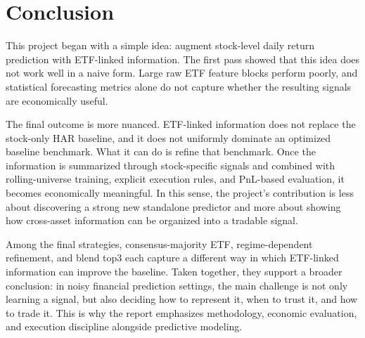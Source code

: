 \section{Conclusion}

This project began with a simple idea: augment stock-level daily return prediction with ETF-linked information. The first pass showed that this idea does not work well in a naive form. Large raw ETF feature blocks perform poorly, and statistical forecasting metrics alone do not capture whether the resulting signals are economically useful.

The final outcome is more nuanced. ETF-linked information does not replace the stock-only HAR baseline, and it does not uniformly dominate an optimized baseline benchmark. What it can do is refine that benchmark. Once the information is summarized through stock-specific signals and combined with rolling-universe training, explicit execution rules, and PnL-based evaluation, it becomes economically meaningful. In this sense, the project's contribution is less about discovering a strong new standalone predictor and more about showing how cross-asset information can be organized into a tradable signal.

Among the final strategies, consensus-majority ETF, regime-dependent refinement, and blend top3 each capture a different way in which ETF-linked information can improve the baseline. Taken together, they support a broader conclusion: in noisy financial prediction settings, the main challenge is not only learning a signal, but also deciding how to represent it, when to trust it, and how to trade it. This is why the report emphasizes methodology, economic evaluation, and execution discipline alongside predictive modeling.
